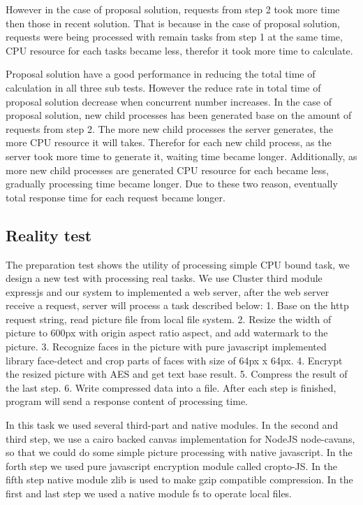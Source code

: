 \documentclass[JIP]{ipsj}
\begin{document}
However in the case of proposal solution, requests from step 2 took more time then those in recent solution. That is because in the case of proposal solution, requests were being processed with remain tasks from step 1 at the same time, CPU resource for each tasks became less, therefor it took more time to calculate.

Proposal solution have a good performance in reducing the total time of calculation in all three sub tests. 
However the reduce rate in total time of proposal solution decrease when concurrent number increases. In the case of proposal solution, new child processes has been generated base on the amount of requests from step 2. The more new child processes the server generates, the more CPU resource it will takes. Therefor for each new child process, as the server took more time to generate it, waiting time became longer. Additionally, as more new child processes are generated CPU resource for each became less, gradually processing time became longer. Due to these two reason, eventually total response time for each request became longer.

\subsection{Reality test}

The preparation test shows the utility of processing simple CPU bound task, we design a new test with processing real tasks.
We use Cluster third module expressjs and our system to implemented a web server, after the web server receive a request, server will process a task described below:
1. Base on the http request string, read picture file from local file system.
2. Resize the width of picture to 600px with origin aspect ratio aspect, and add watermark to the picture.
3. Recognize faces in the picture with pure javascript implemented library face-detect and crop parts of faces with size of 64px x 64px.
4. Encrypt the resized picture with AES and get text base result.
5. Compress the result of the last step.
6. Write compressed data into a file.
After each step is finished, program will send a response content of processing time.

In this task we used several third-part and native modules. In the second and third step, we use a cairo backed canvas implementation for NodeJS node-cavans, so that we could do some simple picture processing with native javascript. In the forth step we used pure javascript encryption module called cropto-JS. In the fifth step native module zlib is used to make gzip compatible compression. In the first and last step we used a native module fs to operate local files.
\end{document}
